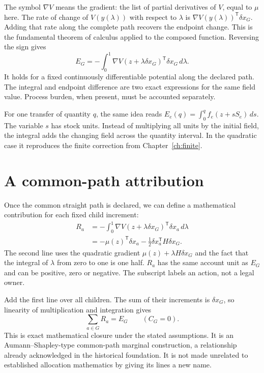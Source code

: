 The symbol $\nabla V$ means the gradient: the list of partial derivatives of $V$, equal to $\mu$ here. The rate of change of $V(y(\lambda))$ with respect to $\lambda$ is $\nabla V(y(\lambda))^{\mathsf T}\delta x_G$. Adding that rate along the complete path recovers the endpoint change. This is the fundamental theorem of calculus applied to the composed function. Reversing the sign gives
\begin{equation}\label{eq:path}
 E_G=-\int_0^1\nabla V(z+\lambda\delta x_G)^{\mathsf T}
                  \delta x_G\,d\lambda.
\end{equation}
It holds for a fixed continuously differentiable potential along the declared path. The integral and endpoint difference are two exact expressions for the same field value. Process burden, when present, must be accounted separately.\cite{foundation,gaussian}

For one transfer of quantity $q$, the same idea reads $E_e(q)=\int_0^q f_e(z+sS_e)\,ds$. The variable $s$ has stock units. Instead of multiplying all units by the initial field, the integral adds the changing field across the quantity interval. In the quadratic case it reproduces the finite correction from Chapter~\ref{ch:finite}.

\section{A common-path attribution}
Once the common straight path is declared, we can define a mathematical contribution for each fixed child increment:
\begin{align}
 R_a&=-\int_0^1\nabla V(z+\lambda\delta x_G)^{\mathsf T}
                 \delta x_a\,d\lambda\label{eq:attribution}\\
 &=-\mu(z)^{\mathsf T}\delta x_a
   -\frac12\delta x_a^{\mathsf T}H\delta x_G.\nonumber
\end{align}
The second line uses the quadratic gradient $\mu(z)+\lambda H\delta x_G$ and the fact that the integral of $\lambda$ from zero to one is one half. $R_a$ has the same account unit as $E_G$ and can be positive, zero or negative. The subscript labels an action, not a legal owner.

Add the first line over all children. The sum of their increments is $\delta x_G$, so linearity of multiplication and integration gives
\begin{equation}\label{eq:closure}
 \sum_{a\in G}R_a=E_G\qquad(C_G=0).
\end{equation}
This is exact mathematical closure under the stated assumptions. It is an Aumann--Shapley-type common-path marginal construction, a relationship already acknowledged in the historical foundation. It is not made unrelated to established allocation mathematics by giving its lines a new name.\cite{foundation,gaussian}

